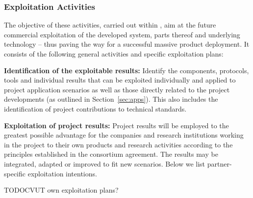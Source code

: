 \subsubsection*{Exploitation Activities}
\label{sec:expl}
The objective of these activities, carried out within \WPInnovation{}, aim at the future commercial exploitation of the developed system, parts thereof and underlying technology -- thus paving the way for a successful massive product deployment. It consists of the following general activities and specific exploitation plans:

\textbf{Identification of the exploitable results:}  Identify the components, protocols, tools and individual results that can be exploited individually and applied to project application scenarios as well as those directly related to the project developments (as outlined in Section~\ref{sec:apps}). This also includes the identification of project contributions to technical standards.

\textbf{Exploitation of project results:}  Project results will be employed to the greatest possible advantage for the companies and research institutions working in the project to their own products and research activities according to the principles established in the consortium agreement. The results may be integrated, adapted or improved to fit new scenarios. Below we list partner-specific exploitation intentions.

TODOCVUT own exploitation plans?

